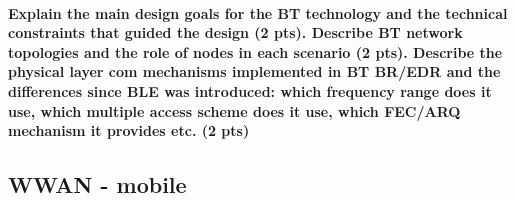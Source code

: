 \textbf{\\Explain the main design goals for the BT technology and the technical constraints that guided the design (2 pts). Describe BT network topologies and the role of nodes in each scenario (2 pts). Describe the physical layer com mechanisms implemented in BT BR/EDR and the differences since BLE was introduced: which frequency range does it use, which multiple access scheme does it use, which FEC/ARQ mechanism it provides etc. (2 pts)}   


\subsection{WWAN - mobile}